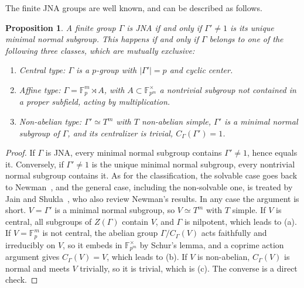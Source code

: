 \documentclass[11pt]{amsart}
\newtheorem{proposition}[theorem]{Proposition}
\theoremstyle{definition}
\theoremstyle{remark}
\theoremstyle{plain}
\numberwithin{equation}{section}
\numberwithin{table}{section}
\newcommand{\F}{\mathbb F}
\begin{document}
The finite JNA groups are well known, and can be described as follows.

\begin{proposition}\label{prop:jna}
A finite group $\Gamma$ is JNA if and only if $\Gamma'\ne1$ is its unique minimal normal subgroup. This happens if and only if $\Gamma$ belongs to one of the following three classes, which are mutually exclusive:
\begin{enumerate}[label=(\alph*)]
\item \emph{Central type:} $\Gamma$ is a $p$-group with $|\Gamma'|=p$ and cyclic center.
\item \emph{Affine type:} $\Gamma=\F_p^m\rtimes A$, with $A\subset\F_{p^m}^\times$ a nontrivial subgroup not contained in a proper subfield, acting by multiplication.
\item \emph{Non-abelian type:} $\Gamma'\simeq T^m$ with $T$ non-abelian simple, $\Gamma'$ is a minimal normal subgroup of $\Gamma$, and its centralizer is trivial, $C_\Gamma(\Gamma')=1$.
\end{enumerate}
\end{proposition}

\begin{proof}
If $\Gamma$ is JNA, every minimal normal subgroup contains $\Gamma'\ne1$, hence equals it. Conversely, if $\Gamma'\ne1$ is the unique minimal normal subgroup, every nontrivial normal subgroup contains it. As for the classification, the solvable case goes back to Newman~\cite{ne1,ne2}, and the general case, including the non-solvable one, is treated by Jain and Shukla~\cite{js}, who also review Newman's results. In any case the argument is short. $V=\Gamma'$ is a minimal normal subgroup, so $V\simeq T^m$ with $T$ simple. If $V$ is central, all subgroups of $Z(\Gamma)$ contain $V$, and $\Gamma$ is nilpotent, which leads to (a). If $V=\F_p^m$ is not central, the abelian group $\Gamma/C_\Gamma(V)$ acts faithfully and irreducibly on $V$, so it embeds in $\F_{p^m}^\times$ by Schur's lemma, and a coprime action argument gives $C_\Gamma(V)=V$, which leads to (b). If $V$ is non-abelian, $C_\Gamma(V)$ is normal and meets $V$ trivially, so it is trivial, which is (c). The converse is a direct check.
\end{proof}
\end{document}
